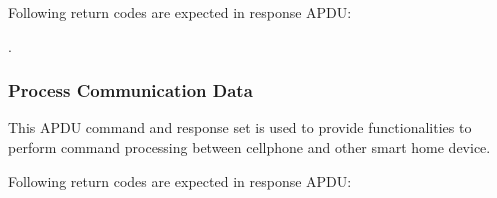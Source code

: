 \begin{table}[!htbp]
\caption{Close Session command APDU}
\label{close-session-apdu}
\end{table}

Following return codes are expected in response APDU:

.\begin{table}[!htbp]
\caption{Close Session Return Code}
\label{close-session-response-apdu}
\end{table}

\subsubsection{Process Communication Data }
This APDU command and response set is used to provide functionalities to perform command processing between cellphone and  other smart home device. 


\begin{table}[!htbp]
\caption{Process data command APDUs}
\label{process-data-cmd-apdu}
\end{table}

Following return codes are expected in response APDU:

